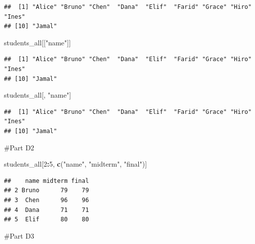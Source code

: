 \documentclass[
]{article}
\newenvironment{Shaded}{\begin{snugshade}}{\end{snugshade}}
\newcommand{\DecValTok}[1]{\textcolor[rgb]{0.00,0.00,0.81}{#1}}
\newcommand{\FunctionTok}[1]{\textcolor[rgb]{0.13,0.29,0.53}{\textbf{#1}}}
\newcommand{\NormalTok}[1]{#1}
\newcommand{\SpecialCharTok}[1]{\textcolor[rgb]{0.81,0.36,0.00}{\textbf{#1}}}
\newcommand{\StringTok}[1]{\textcolor[rgb]{0.31,0.60,0.02}{#1}}
\begin{document}
\begin{verbatim}
##  [1] "Alice" "Bruno" "Chen"  "Dana"  "Elif"  "Farid" "Grace" "Hiro"  "Ines" 
## [10] "Jamal"
\end{verbatim}

\begin{Shaded}
\begin{Highlighting}[]
\NormalTok{students\_all[[}\StringTok{"name"}\NormalTok{]]}
\end{Highlighting}
\end{Shaded}

\begin{verbatim}
##  [1] "Alice" "Bruno" "Chen"  "Dana"  "Elif"  "Farid" "Grace" "Hiro"  "Ines" 
## [10] "Jamal"
\end{verbatim}

\begin{Shaded}
\begin{Highlighting}[]
\NormalTok{students\_all[, }\StringTok{"name"}\NormalTok{]}
\end{Highlighting}
\end{Shaded}

\begin{verbatim}
##  [1] "Alice" "Bruno" "Chen"  "Dana"  "Elif"  "Farid" "Grace" "Hiro"  "Ines" 
## [10] "Jamal"
\end{verbatim}

\#Part D2

\begin{Shaded}
\begin{Highlighting}[]
\NormalTok{students\_all[}\DecValTok{2}\SpecialCharTok{:}\DecValTok{5}\NormalTok{, }\FunctionTok{c}\NormalTok{(}\StringTok{"name"}\NormalTok{, }\StringTok{"midterm"}\NormalTok{, }\StringTok{"final"}\NormalTok{)]}
\end{Highlighting}
\end{Shaded}

\begin{verbatim}
##    name midterm final
## 2 Bruno      79    79
## 3  Chen      96    96
## 4  Dana      71    71
## 5  Elif      80    80
\end{verbatim}

\#Part D3

\begin{Shaded}
\end{Shaded}
\end{document}
